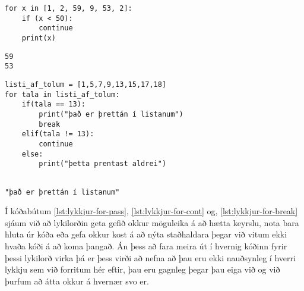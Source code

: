 \lstset{style=venjulegt}
\begin{lstlisting}[caption=Lykilorðið continue notað með for lykkju, label=lst:lykkjur-for-cont]
for x in [1, 2, 59, 9, 53, 2]:
	if (x < 50):
		continue
	print(x)
\end{lstlisting}
\lstset{style=uttak}
\begin{lstlisting}
59
53
\end{lstlisting}
\lstset{style=venjulegt}
\begin{lstlisting}[caption=Lykilorðið continue notað með for lykkju, label=lst:lykkjur-for-break]
listi_af_tolum = [1,5,7,9,13,15,17,18]
for tala in listi_af_tolum:
	if(tala == 13):
		print("það er þrettán í listanum")
		break
	elif(tala != 13):
		continue
	else:
		print("þetta prentast aldrei")
		
\end{lstlisting}
\lstset{style=uttak}
\begin{lstlisting}
"það er þrettán í listanum"
\end{lstlisting}
\lstset{style=venjulegt}
Í kóðabútum \ref{lst:lykkjur-for-pass}, \ref{lst:lykkjur-for-cont} og, \ref{lst:lykkjur-for-break} sjáum við að lykilorðin geta gefið okkur möguleika á að hætta keyrslu, nota bara hluta úr kóða eða gefa okkur kost á að nýta staðhaldara þegar við vitum ekki hvaða kóði á að koma þangað.
Án þess að fara meira út í hvernig kóðinn fyrir þessi lykilorð virka þá er þess virði að nefna að þau eru ekki nauðsynleg í hverri lykkju sem við forritum hér eftir, þau eru gagnleg þegar þau eiga við og við þurfum að átta okkur á hvernær svo er.


